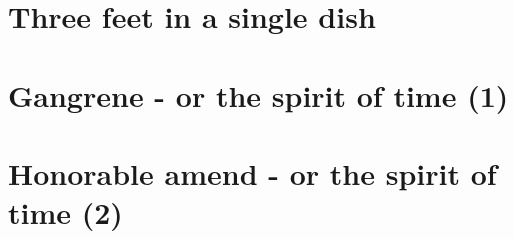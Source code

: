 \section{Three feet in a single dish}

\section{Gangrene - or the spirit of time (1)}

\section{Honorable amend - or the spirit of time (2)}








































%

